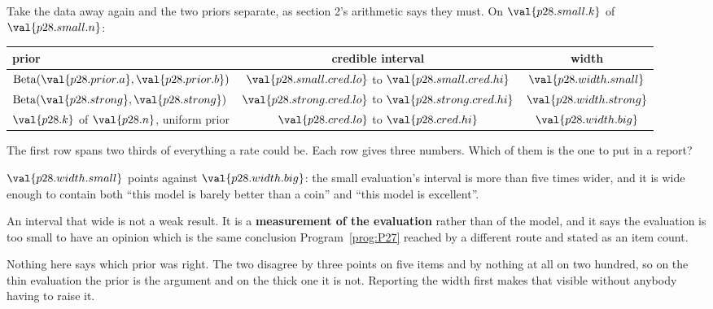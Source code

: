 \begin{fr}
Take the data away again and the two priors separate, as section 2's
arithmetic says they must. On $\val{p28.small.k}$ of $\val{p28.small.n}$:

\begin{center}
\begin{tabular}{lcc}
\toprule
prior & credible interval & width \\
\midrule
$\mathrm{Beta}(\val{p28.prior.a}, \val{p28.prior.b})$
  & $\val{p28.small.cred.lo}$ to $\val{p28.small.cred.hi}$
  & $\val{p28.width.small}$ \\
$\mathrm{Beta}(\val{p28.strong}, \val{p28.strong})$
  & $\val{p28.strong.cred.lo}$ to $\val{p28.strong.cred.hi}$
  & $\val{p28.width.strong}$ \\
\midrule
$\val{p28.k}$ of $\val{p28.n}$, uniform prior
  & $\val{p28.cred.lo}$ to $\val{p28.cred.hi}$
  & $\val{p28.width.big}$ \\
\bottomrule
\end{tabular}
\end{center}

The first row spans two thirds of everything a rate could be. Each row gives
three numbers. Which of them is the one to put in a report?
\dotline
\nextframe
\end{fr}

\begin{fr}

$\val{p28.width.small}$ points against $\val{p28.width.big}$: the small
evaluation's interval is more than five times wider, and it is wide enough to
contain both \enquote{this model is barely better than a coin} and
\enquote{this model is excellent}.

An interval that wide is not a weak result. It is a \textbf{measurement of the
evaluation} rather than of the model, and it says the evaluation is too
small to have an opinion \dash{} which is the same conclusion
Program~\ref{prog:P27} reached by a different route and stated as an item
count.

\begin{note}
Nothing here says which prior was right. The two disagree by three points on
five items and by nothing at all on two hundred, so on the thin evaluation the
prior is the argument and on the thick one it is not. Reporting the width
first makes that visible without anybody having to raise it.
\end{note}
\end{fr}

